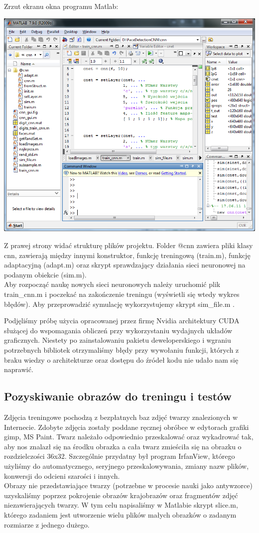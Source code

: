\documentclass[11pt,a4paper]{article}
\begin{document}
Zrzut ekranu okna programu Matlab:

\vspace*{0.5cm}
\includegraphics[scale=0.5]{matlab}
\vspace*{0.5cm}

Z prawej strony widać strukturę plików projektu. Folder @cnn zawiera pliki klasy cnn, zawierają między innymi konstruktor, funkcję treningową (train.m), funkcję adaptacyjną (adapt.m) oraz skrypt sprawdzający działania sieci neuronowej na podanym obiekcie (sim.m).\\
\indent
Aby rozpocząć naukę nowych sieci neuronowych należy uruchomić plik train\_cnn.m i poczekać na zakończenie treningu (wyświetli się wtedy wykres błędów). Aby przeprowadzić symulację wykorzystujemy skrypt sim\_file.m .

Podjęliśmy próbę użycia opracowanej przez firmę Nvidia architektury CUDA służącej do wspomagania obliczeń przy wykorzystaniu wydajnych układów graficznych. Niestety po zainstalowaniu pakietu deweloperskiego i wgraniu potrzebnych bibliotek otrzymaliśmy błędy przy wywołaniu funkcji, których z braku wiedzy o architekturze oraz dostępu do źródeł kodu nie udało nam się naprawić.
  

\subsection{Pozyskiwanie obrazów do treningu i testów}
Zdjęcia treningowe pochodzą z bezpłatnych baz zdjęć twarzy znalezionych w Internecie. Zdobyte zdjęcia zostały poddane ręcznej obróbce w edytorach grafiki gimp, MS Paint. Twarz należało odpowiednio przeskalować oraz wykadrować tak, aby nos znalazł się na środku obrazka a cała twarz zmieściła się na obrazku o rozdzielczości 36x32.  Szczególnie przydatny był program IrfanView, którego użyliśmy do automatycznego, seryjnego przeskalowywania, zmiany nazw plików, konwersji do odcieni szarości i innych.\\
\indent
Obrazy nie przedstawiające twarzy (potrzebne w procesie nauki jako antywzorce) uzyskaliśmy poprzez pokrojenie obrazów krajobrazów oraz fragmentów zdjęć niezawierających twarzy. W tym celu napisaliśmy w Matlabie skrypt slice.m, którego zadaniem jest utworzenie wielu plików małych obrazków o zadanym rozmiarze z jednego dużego.
\end{document}
